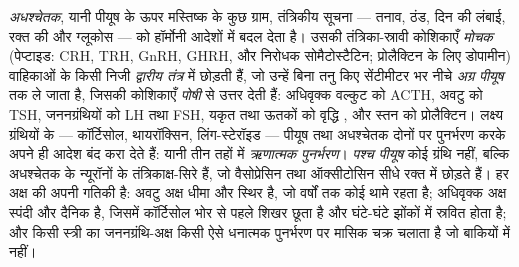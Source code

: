 \begin{definition}[अक्ष]\label{def:b3:endocrinology:axes}
\emph{अधश्चेतक}, यानी पीयूष के ऊपर मस्तिष्क के कुछ ग्राम, तंत्रिकीय
सूचना --- तनाव, ठंड, दिन की लंबाई, रक्त की  और ग्लूकोस ---
को हॉर्मोनी आदेशों में बदल देता है। उसकी तंत्रिका-स्रावी कोशिकाएँ
\emph{मोचक } (पेप्टाइड: CRH, TRH, GnRH, GHRH, और निरोधक
सोमैटोस्टैटिन; प्रोलैक्टिन के लिए डोपामीन) वाहिकाओं के किसी निजी
\emph{द्वारीय तंत्र} में छोड़ती हैं, जो उन्हें बिना तनु किए सेंटीमीटर
भर नीचे \emph{अग्र पीयूष} तक ले जाता है, जिसकी कोशिकाएँ
\emph{पोषी } से उत्तर देती हैं: अधिवृक्क वल्कुट को ACTH, अवटु
को TSH, जननग्रंथियों को LH तथा FSH, यकृत तथा ऊतकों को वृद्धि ,
और स्तन को प्रोलैक्टिन। लक्ष्य ग्रंथियों के  --- कॉर्टिसोल,
थायरॉक्सिन, लिंग-स्टेरॉइड --- पीयूष तथा अधश्चेतक दोनों पर पुनर्भरण
करके अपने ही आदेश बंद करा देते हैं: यानी तीन तहों में
\emph{ऋणात्मक पुनर्भरण}। \emph{पश्च पीयूष} कोई ग्रंथि नहीं, बल्कि
अधश्चेतक के न्यूरॉनों के तंत्रिकाक्ष-सिरे हैं, जो वैसोप्रेसिन तथा
ऑक्सीटोसिन सीधे रक्त में छोड़ते हैं। हर अक्ष की अपनी गतिकी है: अवटु अक्ष
धीमा और स्थिर है, जो वर्षों तक कोई  थामे रहता है; अधिवृक्क अक्ष
स्पंदी और दैनिक है, जिसमें कॉर्टिसोल भोर से पहले शिखर छूता है और
घंटे-घंटे झोंकों में स्रवित होता है; और किसी स्त्री का जननग्रंथि-अक्ष
किसी ऐसे धनात्मक पुनर्भरण पर मासिक चक्र चलाता है जो बाकियों में नहीं।
\end{definition}

